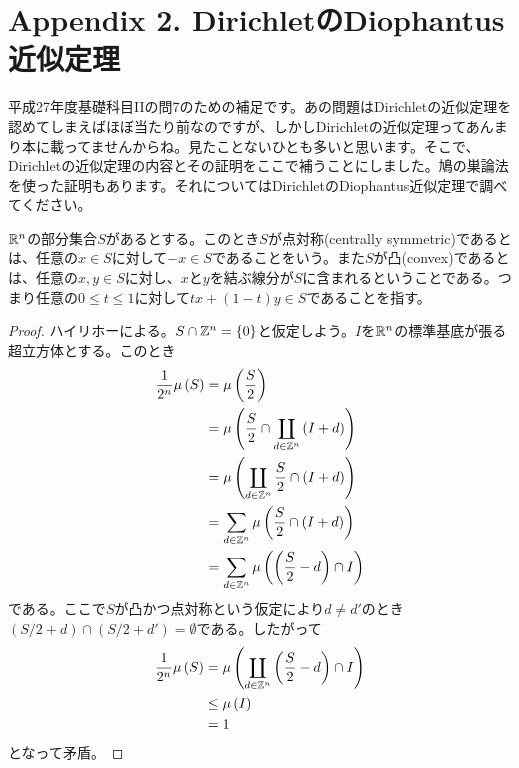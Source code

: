 

\section{Appendix 2. DirichletのDiophantus近似定理}

平成27年度基礎科目IIの問7のための補足です。あの問題はDirichletの近似定理を認めてしまえばほぼ当たり前なのですが、しかしDirichletの近似定理ってあんまり本に載ってませんからね。見たことないひとも多いと思います。そこで、Dirichletの近似定理の内容とその証明をここで補うことにしました。鳩の巣論法を使った証明もあります。それについてはDirichletのDiophantus近似定理で調べてください。




\begin{definition}
${\mathbb R}^n$の部分集合$S$があるとする。このとき$S$が点対称(centrally symmetric)であるとは、任意の$x \in S$に対して$-x \in S$であることをいう。また$S$が凸(convex)であるとは、任意の$x,y \in S$に対し、$x$と$y$を結ぶ線分が$S$に含まれるということである。つまり任意の$0 \leq t \leq 1$に対して$tx + (1-t)y \in S$であることを指す。
\end{definition}

\begin{proof}
ハイリホーによる。$S \cap {\mathbb Z}^n = \{0\}$と仮定しよう。$I$を${\mathbb R}^n$の標準基底が張る超立方体とする。このとき
\begin{align*}
\frac{1}{2^n} \mu \left( S \right) &= \mu\left(\frac{S}{2}\right) \\
&= \mu\left(\frac{S}{2} \cap \coprod_{d \in {\mathbb Z}^n} \left(I + d\right) \right) \\
&= \mu\left( \coprod_{d \in {\mathbb Z}^n}  \frac{S}{2} \cap \left(I + d\right) \right) \\
&= \sum_{d \in {\mathbb Z}^n} \mu\left(   \frac{S}{2} \cap \left(I + d\right) \right) \\
&= \sum_{d \in {\mathbb Z}^n} \mu\left(   \left(\frac{S}{2}- d\right) \cap I \right)
\end{align*}
である。ここで$S$が凸かつ点対称という仮定により$d \neq d'$のとき$(S/2 + d) \cap (S/2 + d') = \emptyset$である。したがって
\begin{align*}
\frac{1}{2^n} \mu\left(S\right) &= \mu\left(   \coprod_{d \in {\mathbb Z}^n} \left(\frac{S}{2}- d\right) \cap I \right) \\
&\leq \mu\left(I\right) \\
&= 1
\end{align*}
となって矛盾。

\end{proof}


